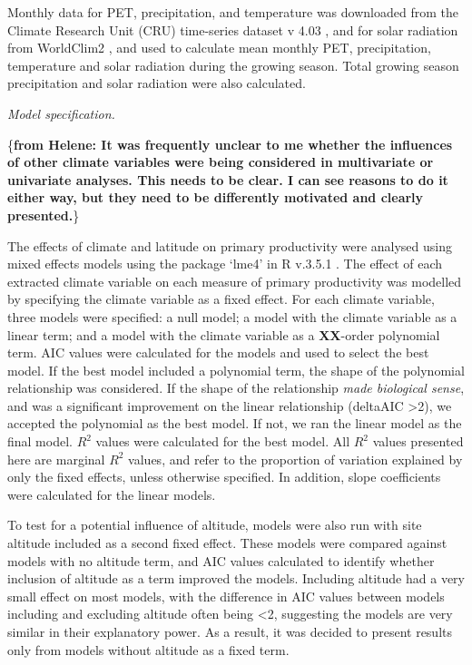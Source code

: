 \documentclass[]{article}
\begin{document}
Monthly data for PET, precipitation, and temperature was downloaded from
the Climate Research Unit (CRU) time-series dataset v 4.03
\citep{harris_updated_2014}, and for solar radiation from WorldClim2
\citep{fick_worldclim_2017}, and used to calculate mean monthly PET,
precipitation, temperature and solar radiation during the growing
season. Total growing season precipitation and solar radiation were also
calculated.

\emph{Model specification.}

\{\textbf{from Helene: It was frequently unclear to me whether the
influences of other climate variables were being considered in
multivariate or univariate analyses. This needs to be clear. I can see
reasons to do it either way, but they need to be differently motivated
and clearly presented.}\}

The effects of climate and latitude on primary productivity were
analysed using mixed effects models using the package `lme4'
\citep{bates_fitting_2015} in R v.3.5.1 \citep{r_core_team_r:_2018}. The
effect of each extracted climate variable on each measure of primary
productivity was modelled by specifying the climate variable as a fixed
effect. For each climate variable, three models were specified: a null
model; a model with the climate variable as a linear term; and a model
with the climate variable as a \textbf{XX}-order polynomial term. AIC
values were calculated for the models and used to select the best model.
If the best model included a polynomial term, the shape of the
polynomial relationship was considered. If the shape of the relationship
\emph{made biological sense}, and was a significant improvement on the
linear relationship (deltaAIC \textgreater{}2), we accepted the
polynomial as the best model. If not, we ran the linear model as the
final model. \(R^2\) values were calculated for the best model. All
\(R^2\) values presented here are marginal \(R^2\) values, and refer to
the proportion of variation explained by only the fixed effects, unless
otherwise specified. In addition, slope coefficients were calculated for
the linear models.

To test for a potential influence of altitude, models were also run with
site altitude included as a second fixed effect. These models were
compared against models with no altitude term, and AIC values calculated
to identify whether inclusion of altitude as a term improved the models.
Including altitude had a very small effect on most models, with the
difference in AIC values between models including and excluding altitude
often being \textless{}2, suggesting the models are very similar in
their explanatory power. As a result, it was decided to present results
only from models without altitude as a fixed term.
\end{document}
